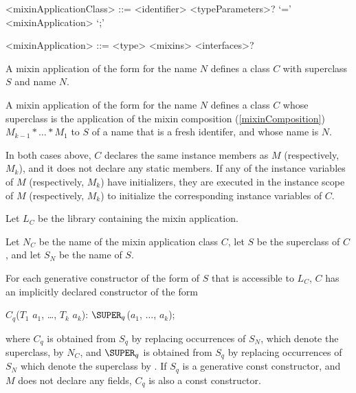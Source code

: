 \documentclass[makeidx]{article}
\begin{document}
\begin{grammar}
<mixinApplicationClass> ::= \gnewline{}
  <identifier> <typeParameters>? `=' <mixinApplication> `;'

<mixinApplication> ::= <type> <mixins> <interfaces>?
\end{grammar}

\LMHash{}%
A mixin application of the form  for the name $N$ defines a class $C$ with superclass $S$ and name $N$.

\LMHash{}%
A mixin application of the form  for the name $N$ defines a class $C$ whose superclass is the application of the mixin composition (\ref{mixinComposition}) $M_{k-1} * \ldots * M_1$ to $S$ of a name that is a fresh identifer, and whose name is $N$.

\LMHash{}%
In both cases above, $C$ declares the same instance members as $M$ (respectively, $M_k$),
and it does not declare any static members.
If any of the instance variables of $M$ (respectively, $M_k$) have initializers,
they are executed in the instance scope of $M$ (respectively, $M_k$)
to initialize the corresponding instance variables of $C$.

\LMHash{}%
Let $L_C$ be the library containing the mixin application.

Let $N_C$ be the name of the mixin application class $C$,
let $S$ be the superclass of $C$, and let $S_N$ be the name of $S$.

For each generative constructor of the form  of $S$ that is accessible to $L_C$, $C$ has an implicitly declared constructor of the form

\begin{dartCode}
$C_q$($T_{1}$ $a_{1}$, \ldots, $T_{k}$ $a_{k}$): $\SUPER_q$($a_{1}$, $\ldots$, $a_{k}$);
\end{dartCode}

\noindent
where $C_q$ is obtained from $S_q$ by replacing occurrences of $S_N$,
which denote the superclass, by $N_C$, and $\SUPER_q$ is obtained from $S_q$ by
replacing occurrences of $S_N$ which denote the superclass by \SUPER{}.
If $S_q$ is a generative const constructor, and $M$ does not declare any
fields, $C_q$ is also a const constructor.
\end{document}
